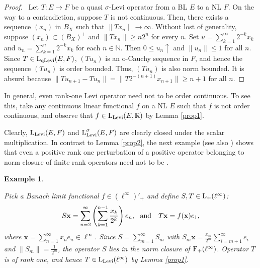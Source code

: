 \documentclass[10pt]{article}
\makeatletter
\newtheorem{example}[theorem]{Example}
\renewcommand{\subsection}{\@startsection{subsection}{1}
{0pt}{3.25ex plus 1ex minus.2ex}{-1em}{\normalfont\normalsize\bf}}
\makeatother
\begin{document}
{{{\begin{proof}\
Let $T:E\to F$ be a quasi $\sigma$-Levi operator from a BL $E$ to a NL $F$.
On the way to a contradiction, suppose $T$ is not continuous. Then, there exists a 
sequence $(x_n)$ in $B_X$ such that $\|Tx_n\|\to\infty$. Without lost of generality,
suppose $(x_n)\subset(B_X)^+$ and $\|Tx_n\|\ge n2^n$ for every $n$.
Set $u=\sum\limits_{k=1}^\infty 2^{-k}x_k$ and $u_n=\sum\limits_{k=1}^n 2^{-k}x_k$ for each $n\in\mathbb{N}$.
Then $0\le u_n\uparrow$ and $\|u_n\|\le 1$ for all $n$. Since $T\in\text{\rm L}_{\text{\rm qLevi}}(E,F)$, 
$(Tu_n)$ is an o-Cauchy sequence in $F$, and hence the sequence $(Tu_n)$ is order bounded. 
Thus, $(Tu_n)$ is also norm bounded. It is absurd because $\|Tu_{n+1}-Tu_n\|=\|T2^{-(n+1)}x_{n+1}\|\ge n+1$ for all $n$.
\end{proof}

\noindent
In general, even rank-one Levi operator need not to be order continuous. To see this, take any continuous linear functional $f$ on a NL $E$
such that $f$ is not order continuous, and observe that $f\in\text{\rm L}_{\text{\rm Levi}}(E,\mathbb{R})$ by Lemma \ref{prop1}.

\medskip
Clearly, $\text{\rm L}_{\text{\rm Levi}}(E,F)$ and $\text{\rm L}^\sigma_{\text{\rm Levi}}(E,F)$
are clearly closed under the scalar multiplication.
In contrast to Lemma \ref{prop2}, the next example (see also \cite[Example 4]{E2025-1}) shows that even a positive rank one perturbation
of a positive  operator belonging to norm closure of finite rank operators
need not to be \text{\rm Levi}.

\begin{example}\label{Levi are not VS}%
{\em
Pick a Banach limit functional $f\in(\ell^\infty)'_+$ and 
define $S,T\in\text{\rm L}_+(\ell^\infty)$:
$$
   S\mathbf{x} =
   \sum_{n=2}^\infty\left(\sum_{k=1}^{n-1}\frac{x_k}{2^k}\right) e_n, \ \ \text{\rm and} \ \ \
   T\mathbf{x} = f(\mathbf{x})e_1,
$$
where $\mathbf{x}=\sum_{n=1}^\infty x_n e_n\in\ell^\infty$. 
Since $S=\sum_{m=1}^\infty S_m$ with 
$S_m\mathbf{x}=\frac{x_m}{2^m}\sum_{i=m+1}^\infty e_i$ and $\|S_m\|=\frac{1}{2^m}$,
the operator $S$ lies in the norm closure of $\text{\rm F}_+(\ell^\infty)$.
Operator $T$ is of rank one, and hence $T\in\text{\rm L}_{\text{\rm Levi}}(\ell^\infty)$ 
by Lemma \ref{prop1}.

}
\end{example}}}}
\end{document}
